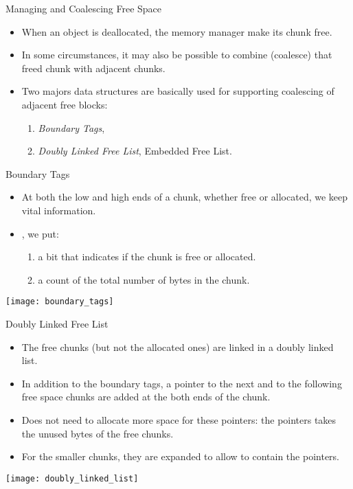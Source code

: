 \begin{bibunit}[apalike]
\begin{frame}{Managing and Coalescing Free Space}
	\begin{itemize}
	\item When an object is deallocated, the memory manager make its chunk free.
	\item In some circumstances, it may also be possible to combine (coalesce) that freed chunk with adjacent chunks.
	\vfill
	\item Two majors data structures are basically used for supporting coalescing of adjacent free blocks:
		\begin{enumerate}
		\item \emph{Boundary Tags},
		\item \emph{Doubly Linked Free List}, Embedded Free List.
		\end{enumerate}
	\end{itemize}
\end{frame}

\begin{frame}{Boundary Tags}
	\begin{itemize}
	\item At both the low and high ends of a chunk, whether free or allocated, we keep vital information.
	\vfill
	\item {}, we put:
		\begin{enumerate}
		\item a bit that indicates if the chunk is free or allocated.
		\item a count of the total number of bytes in the chunk.
		\end{enumerate}
	\end{itemize}
	\vfill
	\begin{center}
		\texttt{[image: boundary\_tags]}
	\end{center}
\end{frame}

\begin{frame}{Doubly Linked Free List}
	\begin{itemize}
	\item The free chunks (but not the allocated ones) are linked in a doubly linked list.
	\vfill
	\item In addition to the boundary tags, a pointer to the next and to the following free space chunks are added at the both ends of the chunk.
	\vfill
	\item Does not need to allocate more space for these pointers: the pointers takes the unused bytes of the free chunks.
	\item For the smaller chunks, they are expanded to allow to contain the pointers.
	\end{itemize}
	\vfill
	\begin{center}
		\texttt{[image: doubly\_linked\_list]}
	\end{center}
\end{frame}


\end{bibunit}
